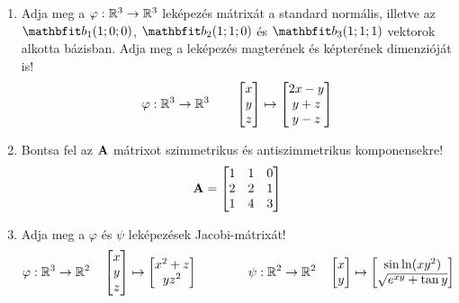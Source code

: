 \documentclass{szb-practice}
\begin{document}
\begin{enumerate}
  \item Adja meg a $\varphi : \mathbb{R}^3 \to \mathbb{R}^3$ leképezés mátrixát a
        standard normális, illetve az $\rvec b_1(1; 0; 0)$, $\rvec b_2(1; 1; 0)$
        és $\rvec b_3(1; 1; 1)$ vektorok alkotta bázisban. Adja meg a leképezés
        magterének és képterének dimenzióját is!
        $$
          \varphi : \mathbb{R}^3 \to \mathbb{R}^3
          \qquad
          \begin{bmatrix}
            x \\ y \\ z
          \end{bmatrix}
          \mapsto
          \begin{bmatrix}
            2x - y \\ y + z \\ y - z
          \end{bmatrix}
        $$

  \item Bontsa fel az $\mathbf{A}$ mátrixot szimmetrikus és antiszimmetrikus
        komponensekre!
        $$
          \mathbf{A} = \begin{bmatrix}
            1 & 1 & 0 \\
            2 & 2 & 1 \\
            1 & 4 & 3
          \end{bmatrix}
        $$

  \item Adja meg a $\varphi$ és $\psi$ leképezések Jacobi-mátrixát!
        $$
          \varphi : \mathbb{R}^3 \to \mathbb{R}^2
          \quad
          \begin{bmatrix}
            x \\ y \\ z
          \end{bmatrix}
          \mapsto
          \begin{bmatrix}
            x^2 + z \\ y z^2
          \end{bmatrix}
          \qquad\qquad
          \psi : \mathbb{R}^2 \to \mathbb{R}^2
          \quad
          \begin{bmatrix}
            x \\ y
          \end{bmatrix}
          \mapsto
          \begin{bmatrix}
            \sin \ln (x y^2) \\ \sqrt{e^{xy} + \tan y}
          \end{bmatrix}
        $$


\end{enumerate}
\end{document}
